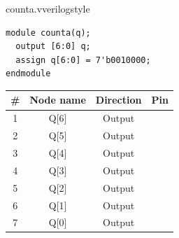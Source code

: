 \begin{procedure}
    \begin{codepanel}{counta.v}{verilogstyle}
        \begin{lstlisting}
module counta(q);
  output [6:0] q;
  assign q[6:0] = 7'b0010000;
endmodule
\end{lstlisting}
    \end{codepanel}
    \vspace{-4pt}

    \needspace{4cm}
    \begin{boxedtable}
        \label{tab:exp3-pins}
        {\renewcommand{\arraystretch}{1.5}
            \centering
            \begin{tabular}{cccc}
                \toprule
                \# & Node name & Direction & Pin \\
                \midrule
                1  & Q[6]      & Output    &     \\
                2  & Q[5]      & Output    &     \\
                3  & Q[4]      & Output    &     \\
                4  & Q[3]      & Output    &     \\
                5  & Q[2]      & Output    &     \\
                6  & Q[1]      & Output    &     \\
                7  & Q[0]      & Output    &     \\
                \bottomrule
            \end{tabular}
        }
    \end{boxedtable}

\end{procedure}
